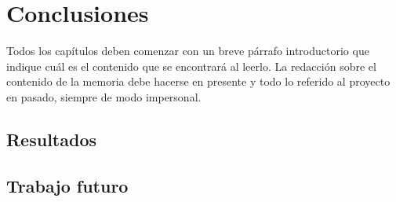 
\chapter{Conclusiones} %

\label{Chapter5} %


Todos los capítulos deben comenzar con un breve párrafo introductorio que indique cuál es el contenido que se encontrará al leerlo.  La redacción sobre el contenido de la memoria debe hacerse en presente y todo lo referido al proyecto en pasado, siempre de modo impersonal.

\section{Resultados}


\section{Trabajo futuro}
